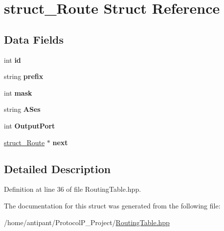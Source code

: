 \hypertarget{structstruct__Route}{\section{struct\-\_\-\-Route Struct Reference}
\label{structstruct__Route}
}
\subsection*{Data Fields}
\begin{DoxyCompactItemize}
\item 
\hypertarget{structstruct__Route_a3dff90ab63fcc429ca80a3ef8ef3ad48}{int {\bfseries id}}\label{structstruct__Route_a3dff90ab63fcc429ca80a3ef8ef3ad48}

\item 
\hypertarget{structstruct__Route_aa37611b878f02a5b6dd235010dff0656}{string {\bfseries prefix}}\label{structstruct__Route_aa37611b878f02a5b6dd235010dff0656}

\item 
\hypertarget{structstruct__Route_a686f4a523cc70a19ba1725676b7a281e}{int {\bfseries mask}}\label{structstruct__Route_a686f4a523cc70a19ba1725676b7a281e}

\item 
\hypertarget{structstruct__Route_aa701995db61b15b8218cd649a2e1f062}{string {\bfseries A\-Ses}}\label{structstruct__Route_aa701995db61b15b8218cd649a2e1f062}

\item 
\hypertarget{structstruct__Route_a45a03fa95a6c99b6c232befd759effce}{int {\bfseries Output\-Port}}\label{structstruct__Route_a45a03fa95a6c99b6c232befd759effce}

\item 
\hypertarget{structstruct__Route_ab3531db9abe6c0ca498ed592919c0cc7}{\hyperlink{structstruct__Route}{struct\-\_\-\-Route} $\ast$ {\bfseries next}}\label{structstruct__Route_ab3531db9abe6c0ca498ed592919c0cc7}

\end{DoxyCompactItemize}


\subsection{Detailed Description}


Definition at line 36 of file Routing\-Table.\-hpp.



The documentation for this struct was generated from the following file\-:\begin{DoxyCompactItemize}
\item 
/home/antipant/\-Protocol\-P\-\_\-\-Project/\hyperlink{RoutingTable_8hpp}{Routing\-Table.\-hpp}\end{DoxyCompactItemize}
